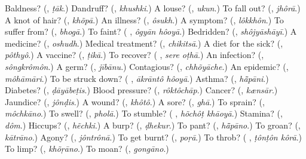 \begin{tcolorbox}[breakable,colback=teal!4,colframe=teal!35!black,title={Before you move on}]
Baldness? (\textbf{}, \emph{ṭāk}.) Dandruff? (\textbf{}, \emph{khushki}.) A louse? (\textbf{}, \emph{ukun}.) To fall out? (\textbf{}, \emph{jhôrā}.) A knot of hair? (\textbf{}, \emph{khõpā}.) An illness? (\textbf{}, \emph{ôsukh}.) A symptom? (\textbf{}, \emph{lôkkhôn}.) To suffer from? (\textbf{}, \emph{bhogā}.) To faint? (\textbf{ }, \emph{ôgyān hôoyā}.) Bedridden? (\textbf{}, \emph{shôjyāshāyī}.) A medicine? (\textbf{}, \emph{oshudh}.) Medical treatment? (\textbf{}, \emph{chikitsā}.) A diet for the sick? (\textbf{}, \emph{pôthyô}.) A vaccine? (\textbf{}, \emph{ṭikā}.) To recover? (\textbf{ }, \emph{sere oṭhā}.) An infection? (\textbf{}, \emph{sôngkrômôn}.) A germ? (\textbf{}, \emph{jībānu}.) Contagious? (\textbf{}, \emph{chhõyāche}.) An epidemic? (\textbf{}, \emph{môhāmāri}.) To be struck down? (\textbf{ }, \emph{ākrāntô hôoyā}.) Asthma? (\textbf{}, \emph{hā̃pāni}.) Diabetes? (\textbf{}, \emph{ḍāyābeṭis}.) Blood pressure? (\textbf{}, \emph{rôktôchāp}.) Cancer? (\textbf{}, \emph{kænsār}.) Jaundice? (\textbf{}, \emph{jônḍis}.) A wound? (\textbf{}, \emph{khôtô}.) A sore? (\textbf{}, \emph{ghā}.) To sprain? (\textbf{}, \emph{môchkāno}.) To swell? (\textbf{}, \emph{pholā}.) To stumble? (\textbf{ }, \emph{hõchôṭ khāoyā}.) Stamina? (\textbf{}, \emph{dôm}.) Hiccups? (\textbf{}, \emph{hẽchki}.) A burp? (\textbf{}, \emph{ḍhekur}.) To pant? (\textbf{}, \emph{hā̃pāno}.) To groan? (\textbf{}, \emph{kātrāno}.) Agony? (\textbf{}, \emph{jôntrônā}.) To get burnt? (\textbf{}, \emph{poṛā}.) To throb? (\textbf{ }, \emph{ṭônṭôn kôrā}.) To limp? (\textbf{}, \emph{khõṛāno}.) To moan? (\textbf{}, \emph{gongāno}.)
\end{tcolorbox}
